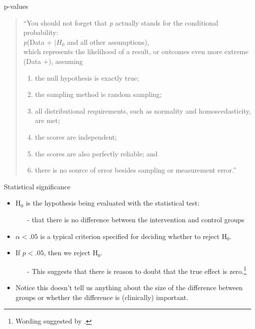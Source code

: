 \documentclass{beamer}
\begin{document}
%
\begin{frame}{p-values}
\begin{quote}
``You should not forget that \emph{p} actually stands for the conditional probability: \\
\vspace{2mm}
\emph{p}(Data + $| H_0$ and all other assumptions), \\
\vspace{2mm}
which represents the likelihood of a result, or outcomes even more extreme (Data +), assuming
	\begin{enumerate}
	\item the null hypothesis is exactly true;
	\item the sampling method is random sampling;
	\item all distributional requirements, such as normality and homoscedasticity, are met;
	\item the scores are independent;
	\item the scores are also perfectly reliable; and
	\item there is no source of error besides sampling or measurement error.'' \citep[p. 74]{Kline2013}
	\end{enumerate} 
\end{quote}
\end{frame}

% 
\begin{frame}{Statistical significance}
	\begin{itemize}
	\item H$_0$ is the hypothesis being evaluated with the statistical test:	
		\begin{itemize}
		\item[-] that there is no difference between the intervention and control groups
		\end{itemize}
	\item $\alpha < .05$ is a typical criterion specified for deciding whether to reject H$_0$.
	\item If $p < .05$, then we reject H$_0$.
		\begin{itemize}
		\item[-] This suggests that there is reason to doubt that the true effect is zero.\footnote{\tiny{Wording suggested by \citet [p. 4]{Spence2018}.}}
		\end{itemize} 
	\item Notice this doesn't tell us anything about the \alert{size of the difference} between groups or whether the difference is \alert{(clinically) important}.
	\end{itemize}
\end{frame}
\end{document}
